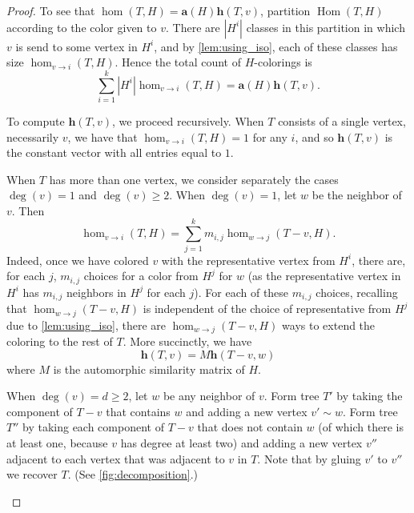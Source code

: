 \documentclass[11pt]{article}
\theoremstyle{definition}
\newcommand{\homclass}[4]{\hom_{#1\to#2}(#3,#4)}
\DeclareMathOperator{\Hom}{Hom}
\begin{document}
\begin{proof}
To see that $\hom(T,H)={\mathbf a}(H) \mathbf{h}(T,v)$, partition $\Hom(T,H)$ according to the color given to $v$. There are $|H^i|$ classes in this partition in which $v$ is send to some vertex in $H^i$, and by \cref{lem:using_iso}, each of these classes has size $\homclass{v}{i}{T}{H}$. Hence the total count of $H$-colorings is
\[
\sum_{i=1}^k |H^i|\homclass{v}{i}{T}{H} = {\mathbf a}(H) \mathbf{h}(T,v).
\]

To compute $\mathbf{h}(T,v)$, we proceed recursively. When $T$ consists of a single vertex, necessarily $v$, we have that $\homclass{v}{i}{T}{H} = 1$ for any $i$, and so $\mathbf{h}(T,v)$ is the constant vector with all entries equal to $1$. 

When $T$ has more than one vertex, we consider separately the cases $\deg(v) = 1$ and $\deg(v) \ge 2$. When $\deg(v) = 1$, let $w$ be the neighbor of $v$. Then
\[ \homclass{v}{i}{T}{H} = \sum_{j=1}^k m_{i,j}\homclass{w}{j}{T-v}{H}.\]
Indeed, once we have colored $v$ with the representative vertex from $H^i$, there are, for each $j$, $m_{i,j}$ choices for a color from $H^j$ for $w$ (as the representative vertex in $H^i$ has $m_{i,j}$ neighbors in $H^j$ for each $j$). For each of these $m_{i,j}$ choices, recalling that $\homclass{w}{j}{T-v}{H}$ is independent of the choice of representative from $H^j$ due to \cref{lem:using_iso}, there are $\homclass{w}{j}{T-v}{H}$ ways to extend the coloring to the rest of $T$. More succinctly, we have
\begin{equation} \label{eq:treewalkalgorithm-pathcase} 
\mathbf{h}(T,v) = M \mathbf{h}(T-v,w)
\end{equation}
where $M$ is the automorphic similarity matrix of $H$. 

When $\deg(v) = d \ge 2$, let $w$ be any neighbor of $v$. Form tree $T'$ by taking the component of $T-v$ that contains $w$ and adding a new vertex $v' \sim w$. Form tree $T''$ by taking each component of $T-v$ that does not contain $w$ (of which there is at least one, because $v$ has degree at least two) and adding a new vertex $v''$ adjacent to each vertex that was adjacent to $v$ in $T$. Note that by gluing $v'$ to $v''$ we recover $T$. (See \cref{fig:decomposition}.)

\begin{figure}[ht]
    \centering
\end{figure}
\end{proof}
\end{document}
